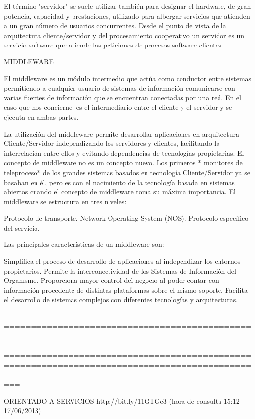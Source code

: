     El término "servidor" se suele utilizar también para designar el hardware, de gran potencia, capacidad y prestaciones, utilizado para 
    albergar servicios que atienden a un gran número de usuarios concurrentes. Desde el punto de vista de la arquitectura cliente/servidor 
    y del procesamiento cooperativo un servidor es un servicio software que atiende las peticiones de procesos software clientes.
    
    
MIDDLEWARE

El middleware es un módulo intermedio que actúa como conductor entre sistemas permitiendo a cualquier usuario de sistemas de información 
comunicarse con varias fuentes de información que se encuentran conectadas por una red. En el caso que nos concierne, es el intermediario 
entre el cliente y el servidor y se ejecuta en ambas partes.

La utilización del middleware permite desarrollar aplicaciones en arquitectura Cliente/Servidor independizando los servidores y clientes, 
facilitando la interrelación entre ellos y evitando dependencias de tecnologías propietarias. El concepto de middleware no es un concepto 
nuevo. Los primeros * monitores de teleproceso* de los grandes sistemas basados en tecnología Cliente/Servidor ya se basaban en él, pero 
es con el nacimiento de la tecnología basada en sistemas abiertos cuando el concepto de middleware toma su máxima importancia. El middleware 
se estructura en tres niveles:

    Protocolo de transporte.
    Network Operating System (NOS).
    Protocolo específico del servicio.

Las principales características de un middleware son:

    Simplifica el proceso de desarrollo de aplicaciones al independizar los entornos propietarios.
    Permite la interconectividad de los Sistemas de Información del Organismo.
    Proporciona mayor control del negocio al poder contar con información procedente de distintas plataformas sobre el mismo soporte.
    Facilita el desarrollo de sistemas complejos con diferentes tecnologías y arquitecturas.

=============================================================================================================================================
=============================================================================================================================================

ORIENTADO A SERVICIOS
http://bit.ly/11GTGe3 (hora de consulta 15:12 17/06/2013)

